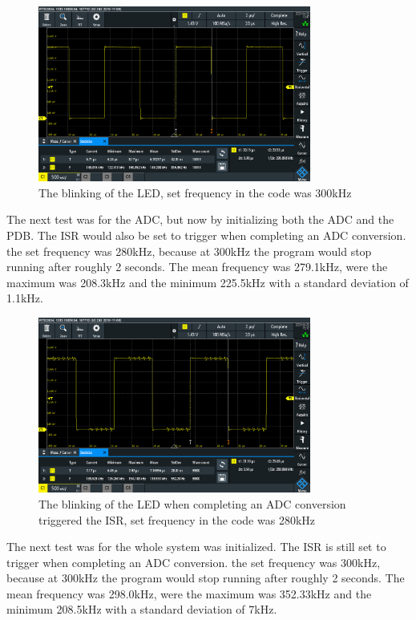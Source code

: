 \begin{figure}[h]
    \centering
    \includegraphics[width=0.8\textwidth]{graphics/STAT03_300.PNG}
    \caption{The blinking of the LED, set frequency in the code was 300kHz}
    \label{fig:PDBsp300}
\end{figure}

The next test was for the ADC, but now by initializing both the ADC and the PDB.
The ISR would also be set to trigger when completing an ADC conversion.
the set frequency was 280kHz, because at 300kHz the program would stop running after roughly 2 seconds.
The mean frequency was 279.1kHz, were the maximum was 208.3kHz and the minimum 225.5kHz with a standard deviation of 1.1kHz. 

\begin{figure}[h]
    \centering
    \includegraphics[width=0.8\textwidth]{graphics/STATADC_280.PNG}
    \caption{The blinking of the LED when completing an ADC conversion triggered the ISR, set frequency in the code was 280kHz}
    \label{fig:PDBADCDMAsp280}
\end{figure}

The next test was for the whole system was initialized.
The ISR is still set to trigger when completing an ADC conversion.
the set frequency was 300kHz, because at 300kHz the program would stop running after roughly 2 seconds.
The mean frequency was 298.0kHz, were the maximum was 352.33kHz and the minimum 208.5kHz with a standard deviation of 7kHz. 

